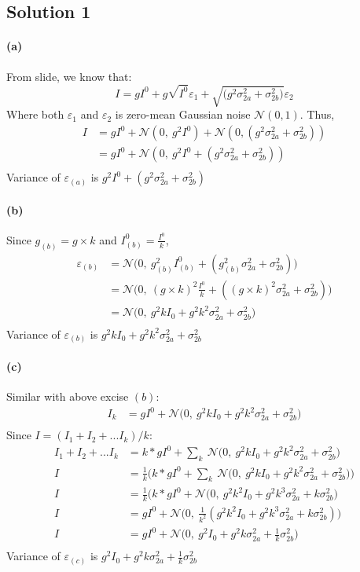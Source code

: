 \documentclass{article}
\newcommand{\solution}[1]{\clearpage \subsection*{Solution #1}}
\newcommand{\spart}[1]{\paragraph{(#1)}}
\begin{document}
\solution{1} 
\spart{a} 
From slide, we know that:
$$
I = gI^0 + g \sqrt{I^0} \varepsilon_1 + \sqrt{\bigg (g^2 \sigma_{2a}^2 + \sigma_{2b}^2 \bigg )} \varepsilon_2
$$             
Where both $\varepsilon_1$ and $\varepsilon_2$ is zero-mean Gaussian noise $\mathcal{N}(0,1)$. Thus,
$$
\begin{aligned}
  I & = gI^0 + \mathcal{N}(0,\ g^2 I^0) + \mathcal{N}(0, (g^2 \sigma_{2a}^2 + \sigma_{2b}^2 )) \\
    & = gI^0 + \mathcal{N}(0,\ g^2 I^0 + (g^2 \sigma_{2a}^2 + \sigma_{2b}^2 )) \\
\end{aligned}
$$           
Variance of $\varepsilon_{(a)}$ is $g^2 I^0 + (g^2 \sigma_{2a}^2 + \sigma_{2b}^2)$

\spart{b}
Since $g_{(b)} = g \times k$ and $I_{(b)}^0 = \frac{I^0}{k}$,
$$
\begin{aligned}
  \varepsilon_{(b)} & = \mathcal{N} \bigg (0, \ g_{(b)}^2 I_{(b)}^0 + (g_{(b)}^2 \sigma_{2a}^2 + \sigma_{2b}^2) \bigg )\\
  & = \mathcal{N} \bigg (0, \ {(g \times k)}^2 \frac{I^0}{k} + ({(g \times k)}^2 \sigma_{2a}^2 + \sigma_{2b}^2) \bigg ) \\
  & = \mathcal{N} \bigg (0, \ g^2 k I_0 + g^2 k^2 \sigma_{2a}^2 + \sigma_{2b}^2 \bigg ) \\
\end{aligned}
$$ 
Variance of $\varepsilon_{(b)}$ is $g^2 k I_0 + g^2 k^2 \sigma_{2a}^2 + \sigma_{2b}^2$

\spart{c}
Similar with above excise $(b)$:
$$
\begin{aligned}
  I_k & = gI^0 + \mathcal{N}\bigg ( 0, \  g^2 k I_0 + g^2 k^2 \sigma_{2a}^2 + \sigma_{2b}^2 \bigg) \\
\end{aligned}
$$ 
Since $I = (I_1 + I_2 + ... I_k)/k $:
$$
\begin{aligned}
  I_1 + I_2 + ... I_k & =  k*gI^0 + \sum_k\ \mathcal{N}\bigg ( 0, \  g^2 k I_0 + g^2 k^2 \sigma_{2a}^2 + \sigma_{2b}^2 \bigg) \\
  I & = \frac{1}{k} \bigg( k*gI^0 + \sum_k\ \mathcal{N}\bigg ( 0, \  g^2 k I_0 + g^2 k^2 \sigma_{2a}^2 + \sigma_{2b}^2 \bigg) \bigg) \\
  I & = \frac{1}{k} \bigg( k*gI^0 + \mathcal{N}\bigg ( 0, \  g^2 k^2 I_0 + g^2 k^3 \sigma_{2a}^2 + k \sigma_{2b}^2 \bigg) \\
  I & = gI^0 + \mathcal{N}\bigg ( 0, \ \frac{1}{k^2} (g^2 k^2 I_0 + g^2 k^3 \sigma_{2a}^2 + k \sigma_{2b}^2) \bigg) \\ 
  I & = gI^0 + \mathcal{N}\bigg ( 0, \ g^2 I_0 + g^2 k \sigma_{2a}^2 + \frac{1}{k} \sigma_{2b}^2 \bigg) \\
\end{aligned}
$$ 
Variance of $\varepsilon_{(c)}$ is $g^2 I_0 + g^2 k \sigma_{2a}^2 + \frac{1}{k} \sigma_{2b}^2$
\end{document}
